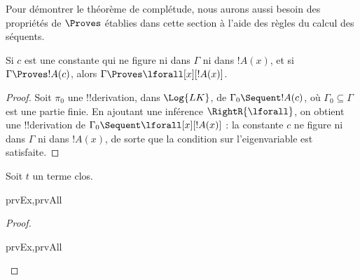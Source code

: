 \documentclass[../../../include/open-logic-section]{subfiles}
\begin{document}

\begin{explain}
Pour démontrer le théorème de complétude, nous aurons aussi besoin
des propriétés de $\Proves$ établies dans cette section à l'aide
des règles du calcul des séquents.
\end{explain}

\begin{thm}
Si $c$ est une constante qui ne figure ni dans $\Gamma$ ni dans
$!A(x)$, et si $\Gamma \Proves !A(c)$, alors
$\Gamma \Proves \lforall[x][!A(x)]$.
\end{thm}

\begin{proof}
Soit $\pi_0$ une !!{derivation}, dans $\Log{LK}$, de
$\Gamma_0 \Sequent !A(c)$, où $\Gamma_0 \subseteq \Gamma$
est une partie finie. En ajoutant une inférence $\RightR{\lforall}$,
on obtient une !!{derivation} de
$\Gamma_0 \Sequent \lforall[x][!A(x)]$ : la constante $c$ ne
figure ni dans $\Gamma$ ni dans $!A(x)$, de sorte que la condition
sur l'eigenvariable est satisfaite.
\end{proof}

\begin{prop}
Soit $t$ un terme clos.
%
%
\begin{tagenumerate}{prvEx,prvAll}
\end{tagenumerate}
\end{prop}

\begin{proof}
\begin{tagenumerate}{prvEx,prvAll}
\end{tagenumerate}
\end{proof}
\end{document}
